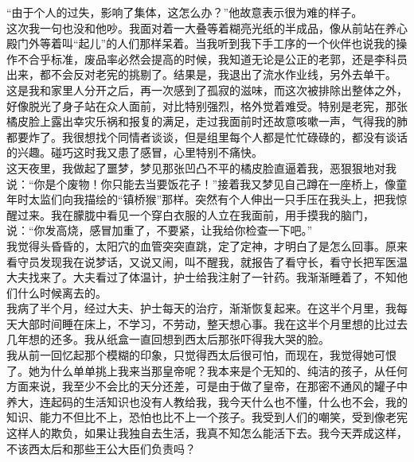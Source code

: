 “由于个人的过失，影响了集体，这怎么办？”他故意表示很为难的样子。\\

这次我一句也没和他吵。我面对着一大叠等着糊亮光纸的半成品，像从前站在养心殿门外等着叫“起儿”的人们那样呆着。当我听到我下手工序的一个伙伴也说我的操作不合乎标准，废品率必然会提高的时候，我知道无论是公正的老郭，还是李科员出来，都不会反对老宪的挑剔了。结果是，我退出了流水作业线，另外去单干。\\

这是我和家里人分开之后，再一次感到了孤寂的滋味，而这次被排除出整体之外，好像脱光了身子站在众人面前，对比特别强烈，格外觉着难受。特别是老宪，那张橘皮脸上露出幸灾乐祸和报复的满足，走过我面前时还故意咳嗽一声，气得我的肺都要炸了。我很想找个同情者谈谈，但是组里每个人都是忙忙碌碌的，都没有谈话的兴趣。碰巧这时我又患了感冒，心里特别不痛快。\\

这天夜里，我做起了噩梦，梦见那张凹凸不平的橘皮脸直逼着我，恶狠狠地对我说：“你是个废物！你只能去当要饭花子！”接着我又梦见自己蹲在一座桥上，像童年时太监们向我描绘的“镇桥猴”那样。突然有个人伸出一只手压在我头上，把我惊醒过来。我在朦胧中看见一个穿白衣服的人立在我面前，用手摸我的脑门，说：“你发高烧，感冒加重了，不要紧，让我给你检查一下吧。”\\

我觉得头昏昏的，太阳穴的血管突突直跳，定了定神，才明白了是怎么回事。原来看守员发现我在说梦话，又说又闹，叫不醒我，就报告了看守长，看守长把军医温大夫找来了。大夫看过了体温计，护士给我注射了一针药。我渐渐睡着了，不知他们什么时候离去的。\\

我病了半个月，经过大夫、护士每天的治疗，渐渐恢复起来。在这半个月里，我每天大部时间睡在床上，不学习，不劳动，整天想心事。我在这半个月里想的比过去几年想的还多。我从纸盒一直回想到西太后那张吓得我大哭的脸。\\

我从前一回忆起那个模糊的印象，只觉得西太后很可怕，而现在，我觉得她可恨了。她为什么单单挑上我来当那皇帝呢？我本来是个无知的、纯洁的孩子，从任何方面来说，我至少不会比的天分还差，可是由于做了皇帝，在那密不通风的罐子中养大，连起码的生活知识也没有人教给我，我今天什么也不懂，什么也不会，我的知识、能力不但比不上，恐怕也比不上一个孩子。我受到人们的嘲笑，受到像老宪这样人的欺负，如果让我独自去生活，我真不知怎么能活下去。我今天弄成这样，不该西太后和那些王公大臣们负责吗？\\

